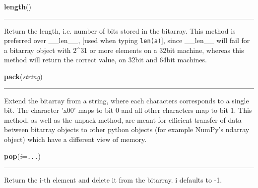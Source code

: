     \label{bitarray:_bitarray:length}

    \vspace{0.5ex}

    \begin{boxedminipage}{\textwidth}

    \raggedright \textbf{length}()

    \vspace{-1.5ex}

    \rule{\textwidth}{0.5\fboxrule}

Return the length, i.e. number of bits stored in the bitarray.
This method is preferred over {\_}{\_}len{\_}{\_}, {[}used when typing \texttt{len(a)}{]},
since {\_}{\_}len{\_}{\_} will fail for a bitarray object with 2{\textasciicircum}31 or more elements
on a 32bit machine, whereas this method will return the correct value,
on 32bit and 64bit machines.
    \vspace{1ex}

    \end{boxedminipage}

    \label{bitarray:_bitarray:pack}

    \vspace{0.5ex}

    \begin{boxedminipage}{\textwidth}

    \raggedright \textbf{pack}(\textit{string})

    \vspace{-1.5ex}

    \rule{\textwidth}{0.5\fboxrule}

Extend the bitarray from a string, where each characters corresponds to
a single bit.  The character 'x00' maps to bit 0 and all other characters
map to bit 1.
This method, as well as the unpack method, are meant for efficient
transfer of data between bitarray objects to other python objects
(for example NumPy's ndarray object) which have a different view of memory.
    \vspace{1ex}

    \end{boxedminipage}

    \label{bitarray:_bitarray:pop}

    \vspace{0.5ex}

    \begin{boxedminipage}{\textwidth}

    \raggedright \textbf{pop}(\textit{i}=\texttt{...})

    \vspace{-1.5ex}

    \rule{\textwidth}{0.5\fboxrule}

Return the i-th element and delete it from the bitarray. i defaults to -1.
    \vspace{1ex}

    \end{boxedminipage}

